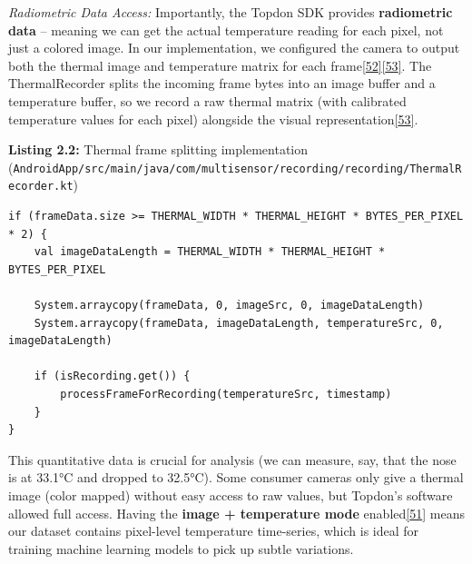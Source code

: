 \documentclass[12pt,a4paper]{article}
\begin{document}
\begin{itemize}
  \emph{Radiometric Data Access:} Importantly, the Topdon SDK provides \textbf{radiometric data} -- meaning we can get the actual temperature reading for each pixel, not just a colored image. In our implementation, we configured the camera to output both the thermal image and temperature matrix for each frame\href{https://github.com/buccancs/bucika_gsr/blob/7048f7f6a7536f5cd577ed2184800d3dad97fd08/AndroidApp/src/main/java/com/multisensor/recording/recording/ThermalRecorder.kt\#L44-L52}{{[}52{]}}\href{https://github.com/buccancs/bucika_gsr/blob/7048f7f6a7536f5cd577ed2184800d3dad97fd08/AndroidApp/src/main/java/com/multisensor/recording/recording/ThermalRecorder.kt\#L80-L88}{{[}53{]}}. The ThermalRecorder splits the incoming frame bytes into an image buffer and a temperature buffer, so we record a raw thermal matrix (with calibrated temperature values for each pixel) alongside the visual representation\href{https://github.com/buccancs/bucika_gsr/blob/7048f7f6a7536f5cd577ed2184800d3dad97fd08/AndroidApp/src/main/java/com/multisensor/recording/recording/ThermalRecorder.kt\#L80-L88}{{[}53{]}}.
\end{itemize}

\textbf{Listing 2.2:} Thermal frame splitting implementation (\passthrough{\lstinline!AndroidApp/src/main/java/com/multisensor/recording/recording/ThermalRecorder.kt!})

\begin{lstlisting}
if (frameData.size >= THERMAL_WIDTH * THERMAL_HEIGHT * BYTES_PER_PIXEL * 2) {
    val imageDataLength = THERMAL_WIDTH * THERMAL_HEIGHT * BYTES_PER_PIXEL

    System.arraycopy(frameData, 0, imageSrc, 0, imageDataLength)
    System.arraycopy(frameData, imageDataLength, temperatureSrc, 0, imageDataLength)

    if (isRecording.get()) {
        processFrameForRecording(temperatureSrc, timestamp)
    }
}
\end{lstlisting}

This quantitative data is crucial for analysis (we can measure, say, that the nose is at 33.1°C and dropped to 32.5°C). Some consumer cameras only give a thermal image (color mapped) without easy access to raw values, but Topdon's software allowed full access. Having the \textbf{image + temperature mode} enabled\href{https://github.com/buccancs/bucika_gsr/blob/7048f7f6a7536f5cd577ed2184800d3dad97fd08/AndroidApp/src/main/java/com/multisensor/recording/recording/ThermalRecorder.kt\#L50-L58}{{[}51{]}} means our dataset contains pixel-level temperature time-series, which is ideal for training machine learning models to pick up subtle variations.
\end{document}
